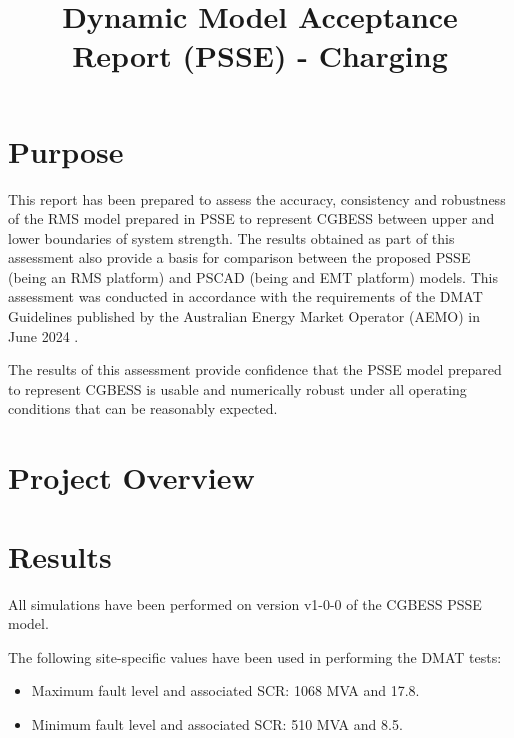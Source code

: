 \documentclass{../grid-link-report}
\title{Dynamic Model Acceptance Report (PSSE) - Charging}
\newcommand{\projectassetsdir}{../project-assets}
\begin{document}
	
	\frontmatter
	\maketitle
	
	\makedisclaimer
	\clearpage
	\tableofcontents
	\makerevisionhistorypage
	
	\mainmatter
	
	
	\chapter{Purpose}
	This report has been prepared to assess the accuracy, consistency and robustness of the \ac{RMS} model prepared in PSSE to represent \ac{CGBESS} between upper and lower boundaries of system strength. The results obtained as part of this assessment also provide a basis for comparison between the proposed PSSE (being an \ac{RMS} platform) and PSCAD (being and \ac{EMT} platform) models. This assessment was conducted in accordance with the requirements of the \ac{DMAT} Guidelines published by the Australian Energy Market Operator (AEMO) in June 2024 \cite{dmat-spec}.
	
	The results of this assessment provide confidence that the PSSE model prepared to represent \ac{CGBESS} is usable and numerically robust under all operating conditions that can be reasonably expected.
	
	
	\chapter{Project Overview}
	
	
	\chapter{Results}
	
	All simulations have been performed on version v1-0-0 of the \ac{CGBESS} PSSE model.
	
	The following site-specific values have been used in performing the \ac{DMAT} tests:
	
	\begin{itemize}
		\item Maximum fault level and associated \ac{SCR}: 1068 MVA and 17.8.
		\item Minimum fault level and associated \ac{SCR}: 510 MVA and 8.5.
	\end{itemize}
	
\end{document}
